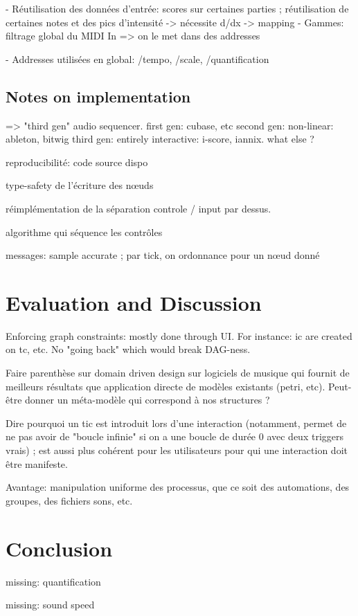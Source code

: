 \documentclass[applsci,article,submit,moreauthors,pdftex,10pt,a4paper]{mdpi}
\begin{document}
- Réutilisation des données d'entrée: scores sur certaines parties ; réutilisation de certaines notes et des pics d'intensité -> nécessite d/dx -> mapping
- Gammes: filtrage global du MIDI In => on le met dans des addresses

- Addresses utilisées en global: /tempo, /scale, /quantification
\subsection{Notes on implementation}


=> "third gen" audio sequencer.
first gen: cubase, etc
second gen: non-linear: ableton, bitwig
third gen: entirely interactive: i-score, iannix. what else ? 

reproducibilité: code source dispo

type-safety de l'écriture des nœuds

réimplémentation de la séparation controle / input par dessus.

algorithme qui séquence les contrôles

messages: sample accurate ; par tick, on ordonnance pour un nœud donné


\section{Evaluation and Discussion}
Enforcing graph constraints: mostly done through UI. For instance: ic are created on tc, etc. No "going back" which would break DAG-ness.

Faire parenthèse sur domain driven design sur logiciels de musique qui fournit de meilleurs résultats que application directe de modèles existants (petri, etc).
Peut-être donner un méta-modèle qui correspond à nos structures ?

Dire pourquoi un tic est introduit lors d'une interaction (notamment, permet de ne pas avoir de "boucle infinie" si on a une boucle de durée 0 avec deux triggers vrais) ; est aussi plus cohérent pour les utilisateurs pour qui une interaction doit être manifeste.

Avantage: manipulation uniforme des processus, que ce soit des automations, des groupes, des fichiers sons, etc.
\section{Conclusion}

missing: quantification

missing: sound speed
\end{document}
